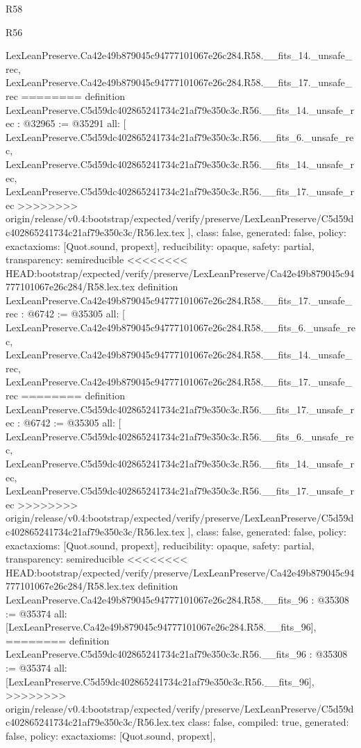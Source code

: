 \begin{lexlean}{R58}
\begin{lexlean}{R56}
\begin{coremodule}
{{{{{{{{{{{{{{{{{{{{{{{{{{{{{{{{{{{{{{{{{{{{{{{{{{{{{{{{{{{{{{{{{{{{{{{{{{{{{{{{{{{{{{{{{{{{{{{{{{{{{{{{{{{{{{{{{{{{{{{{{{{{{{{{{{{{{{{{{{{{{{{{{{{{{{{{{{{{{{{{{{    LexLeanPreserve.Ca42e49b879045c94777101067e26c284.R58.__fits_14._unsafe_rec,
    LexLeanPreserve.Ca42e49b879045c94777101067e26c284.R58.__fits_17._unsafe_rec
========
definition LexLeanPreserve.C5d59dc402865241734c21af79e350c3c.R56.__fits_14._unsafe_rec : @32965 := @35291 {
  all: [
    LexLeanPreserve.C5d59dc402865241734c21af79e350c3c.R56.__fits_6._unsafe_rec,
    LexLeanPreserve.C5d59dc402865241734c21af79e350c3c.R56.__fits_14._unsafe_rec,
    LexLeanPreserve.C5d59dc402865241734c21af79e350c3c.R56.__fits_17._unsafe_rec
>>>>>>>> origin/release/v0.4:bootstrap/expected/verify/preserve/LexLeanPreserve/C5d59dc402865241734c21af79e350c3c/R56.lex.tex
  ],
  class: false,
  generated: false,
  policy: exact{axioms: [Quot.sound, propext]},
  reducibility: opaque{},
  safety: partial,
  transparency: semireducible
}
<<<<<<<< HEAD:bootstrap/expected/verify/preserve/LexLeanPreserve/Ca42e49b879045c94777101067e26c284/R58.lex.tex
definition LexLeanPreserve.Ca42e49b879045c94777101067e26c284.R58.__fits_17._unsafe_rec : @6742 := @35305 {
  all: [
    LexLeanPreserve.Ca42e49b879045c94777101067e26c284.R58.__fits_6._unsafe_rec,
    LexLeanPreserve.Ca42e49b879045c94777101067e26c284.R58.__fits_14._unsafe_rec,
    LexLeanPreserve.Ca42e49b879045c94777101067e26c284.R58.__fits_17._unsafe_rec
========
definition LexLeanPreserve.C5d59dc402865241734c21af79e350c3c.R56.__fits_17._unsafe_rec : @6742 := @35305 {
  all: [
    LexLeanPreserve.C5d59dc402865241734c21af79e350c3c.R56.__fits_6._unsafe_rec,
    LexLeanPreserve.C5d59dc402865241734c21af79e350c3c.R56.__fits_14._unsafe_rec,
    LexLeanPreserve.C5d59dc402865241734c21af79e350c3c.R56.__fits_17._unsafe_rec
>>>>>>>> origin/release/v0.4:bootstrap/expected/verify/preserve/LexLeanPreserve/C5d59dc402865241734c21af79e350c3c/R56.lex.tex
  ],
  class: false,
  generated: false,
  policy: exact{axioms: [Quot.sound, propext]},
  reducibility: opaque{},
  safety: partial,
  transparency: semireducible
}
<<<<<<<< HEAD:bootstrap/expected/verify/preserve/LexLeanPreserve/Ca42e49b879045c94777101067e26c284/R58.lex.tex
definition LexLeanPreserve.Ca42e49b879045c94777101067e26c284.R58.__fits_96 : @35308 := @35374 {
  all: [LexLeanPreserve.Ca42e49b879045c94777101067e26c284.R58.__fits_96],
========
definition LexLeanPreserve.C5d59dc402865241734c21af79e350c3c.R56.__fits_96 : @35308 := @35374 {
  all: [LexLeanPreserve.C5d59dc402865241734c21af79e350c3c.R56.__fits_96],
>>>>>>>> origin/release/v0.4:bootstrap/expected/verify/preserve/LexLeanPreserve/C5d59dc402865241734c21af79e350c3c/R56.lex.tex
  class: false,
  compiled: true,
  generated: false,
  policy: exact{axioms: [Quot.sound, propext]},
}}}}}}}}}}}}}}}}}}}}}}}}}}}}}}}}}}}}}}}}}}}}}}}}}}}}}}}}}}}}}}}}}}}}}}}}}}}}}}}}}}}}}}}}}}}}}}}}}}}}}}}}}}}}}}}}}}}}}}}}}}}}}}}}}}}}}}}}}}}}}}}}}}}}}}}}}}}}}}}}}}}}}
\end{coremodule}
\end{lexlean}
\end{lexlean}
